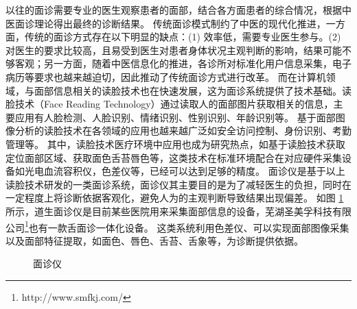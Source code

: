 以往的面诊需要专业的医生观察患者的面部，结合各方面患者的综合情况，根据中医面诊理论得出最终的诊断结果。
传统面诊模式制约了中医的现代化推进，一方面，传统的面诊方式存在以下明显的缺点：(1) 效率低，需要专业医生参与。(2) 对医生的要求比较高，且易受到医生对患者身体状况主观判断的影响，结果可能不够客观；另一方面，随着中医信息化的推进，各诊所对标准化用户信息采集，电子病历等要求也越来越迫切，因此推动了传统面诊方式进行改革。
而在计算机领域，与面部信息相关的读脸技术也在快速发展，这为面诊系统提供了技术基础。读脸技术（Face Reading Technology）通过读取人的面部图片获取相关的信息，主要应用有人脸检测、人脸识别、情绪识别、性别识别、年龄识别等\cite{Schroff2015FaceNet, Zhang2016Joint, corneanu2016survey}。
基于面部图像分析的读脸技术在各领域的应用也越来越广泛如安全访问控制\cite{liu2005ibotguard}、身份识别\cite{he2015delving}、考勤管理\cite{surekha2017attendance}等。
其中，读脸技术医疗环境中应用也成为研究热点，如基于读脸技术获取定位面部区域、获取面色舌苔唇色等，这类技术在标准环境配合在对应硬件采集设备如光电血流容积仪，色差仪等，已经可以达到足够的精度。
面诊仪是基于以上读脸技术研发的一类面诊系统，面诊仪其主要目的是为了减轻医生的负担，同时在一定程度上将诊断依据客观化，避免人为的主观判断导致结果出现偏差\cite{李丹溪2017舌诊仪的发展及其在舌诊客观化研究中的应用现状}。
如图 \ref{fig:med}所示，道生面诊仪\cite{邸丹2016手持式舌象仪的研制}是目前某些医院用来采集面部信息的设备，芜湖圣美孚科技有限公司\footnote{http://www.smfkj.com/}也有一款舌面诊一体化设备。
这类系统利用色差仪、可以实现面部图像采集以及面部特征提取，如面色、唇色、舌苔、舌象等，为诊断提供依据。

\begin{figure}[h]
    \centering
    \caption{面诊仪\cite{邸丹2016手持式舌象仪的研制}}
    \label{fig:med}
\end{figure}

